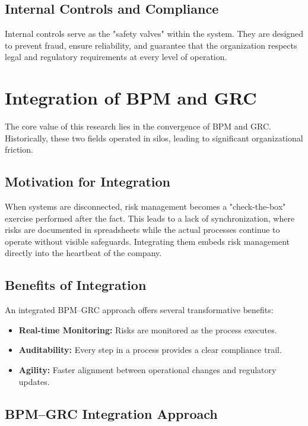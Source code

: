 \subsection{Internal Controls and Compliance}

Internal controls serve as the "safety valves" within the system. They are designed to prevent fraud, ensure reliability, and guarantee that the organization respects legal and regulatory requirements at every level of operation.

\section{Integration of BPM and GRC}

The core value of this research lies in the convergence of BPM and GRC. Historically, these two fields operated in silos, leading to significant organizational friction.

\subsection{Motivation for Integration}

When systems are disconnected, risk management becomes a "check-the-box" exercise performed after the fact. This leads to a lack of synchronization, where risks are documented in spreadsheets while the actual processes continue to operate without visible safeguards. Integrating them embeds risk management directly into the heartbeat of the company.

\subsection{Benefits of Integration}

An integrated BPM--GRC approach offers several transformative benefits:
\begin{itemize}
    \item \textbf{Real-time Monitoring:} Risks are monitored as the process executes.
    \item \textbf{Auditability:} Every step in a process provides a clear compliance trail.
    \item \textbf{Agility:} Faster alignment between operational changes and regulatory updates.
\end{itemize}

\subsection{BPM--GRC Integration Approach}

